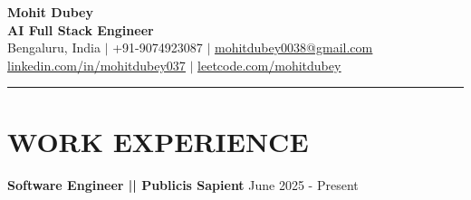 \documentclass[100pt,a4paper]{article}
\newcommand{\sectionline}{
\begin{center}
\vspace{-10pt}
\rule{1\textwidth}{0.5pt}
\end{center}
\vspace{1pt}
}
\begin{document}
\begin{center}
    {\Huge\bfseries Mohit Dubey} \\ \vspace{4pt}
    \textbf{AI Full Stack Engineer } \\ \vspace{6pt}
    \small Bengaluru, India $|$ +91-9074923087 $|$ \href{mailto:mohitdubey0038@gmail.com}{\underline{mohitdubey0038@gmail.com}} \\
    \href{https://www.linkedin.com/in/mohit-dubey-037/}{\underline{linkedin.com/in/mohitdubey037}} $|$ \href{https://leetcode.com/u/mohitdubey037/}
    {\underline{leetcode.com/mohitdubey}}
\end{center}

\sectionline
\section*{WORK EXPERIENCE}
\textbf{Software Engineer || Publicis Sapient}
\hfill June 2025 - Present
\end{document}
